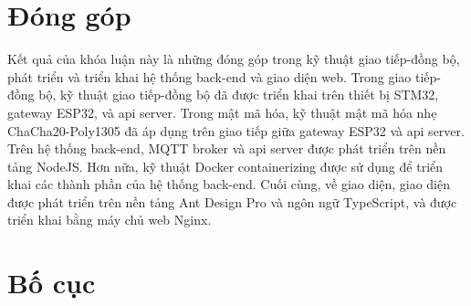 \section{Đóng góp}

Kết quả của khóa luận này là những đóng góp trong kỹ thuật giao tiếp-đồng bộ, phát triển và triển khai hệ thống back-end và giao diện web. Trong giao tiếp-đồng bộ, kỹ thuật giao tiếp-đồng bộ đã được triển khai trên thiết bị STM32, gateway ESP32, và \acrshort{api} server. Trong mật mã hóa, kỹ thuật mật mã hóa nhẹ ChaCha20-Poly1305 đã áp dụng trên giao tiếp giữa gateway ESP32 và \acrshort{api} server. Trên hệ thống back-end, MQTT broker và \acrshort{api} server được phát triển trên nền tảng NodeJS. Hơn nữa, kỹ thuật Docker containerizing được sử dụng để triển khai các thành phần của hệ thống back-end. Cuối cùng, về giao diện, giao diện được phát triển trên nền tảng Ant Design Pro và ngôn ngữ TypeScript, và được triển khai bằng máy chủ web Nginx.

\section{Bố cục}


